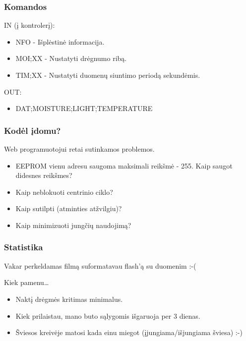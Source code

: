 \documentclass[12pt,a4paper]{beamer}
\begin{document}
\begin{frame}
    \frametitle{Komandos}
    
    IN (į kontrolerį):
    \begin{itemize}
        \item NFO - Išplėstinė informacija.
        \item MOI;XX - Nustatyti drėgnumo ribą.
        \item TIM;XX - Nustatyti duomenų siuntimo periodą sekundėmis.
    \end{itemize}

    OUT:
    \begin{itemize}
        \item DAT;MOISTURE;LIGHT;TEMPERATURE
    \end{itemize}

\end{frame}

\begin{frame}
    \frametitle{Kodėl įdomu?}
    Web programuotojui retai sutinkamos problemos.
    \vskip1cm
    \begin{itemize}
        \item EEPROM vienu adresu saugoma maksimali reikšmė - 255. Kaip saugot didesnes reikšmes?
        \item Kaip neblokuoti centrinio ciklo? 
        \item Kaip sutilpti (atminties atžvilgiu)?
        \item Kaip minimizuoti jungčių naudojimą?
    \end{itemize}
    
\end{frame}

\begin{frame}
    \frametitle{Statistika}

    \begin{center}
        Vakar perkeldamas filmą suformatavau flash'ą su duomenim :-(
    \end{center}

    \pause
    Kiek pamenu\ldots
    \begin{itemize}
        \item Naktį drėgmės kritimas minimalus.
        \item Kiek prilaistau, mano buto sąlygomis išgaruoja per 3 dienas.
        \item Šviesos kreivėje matosi kada einu miegot (įjungiama/išjungiama šviesa) :-)
    \end{itemize}

\end{frame}
\end{document}
